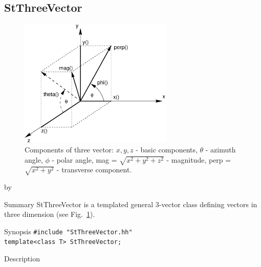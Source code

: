 \documentclass[twoside]{article}
\newcommand{\entrylabel}[1]{\mbox{\textbf{{#1}}}\hfil}%
\newenvironment{entry}
{\begin{list}{}%
    {\renewcommand{\makelabel}{\entrylabel}%
     \setlength{\labelwidth}{90pt}%
     \setlength{\leftmargin}{\labelwidth}
     \advance\leftmargin by \labelsep%
      }%
    }%
  {\end{list}}
\newcommand{\Entrylabel}[1]%
{\raisebox{0pt}[1ex][0pt]{\makebox[\labelwidth][l]%
    {\parbox[t]{\labelwidth}{\hspace{0pt}\textbf{{#1}}}}}}
\newenvironment{Entry}%
{\renewcommand{\entrylabel}{\Entrylabel}\begin{entry}}%
  {\end{entry}}
\begin{document}
\begin{description}
%
%
\subsection{StThreeVector } \label{StThreeVector}
\begin{figure}[bh]
    \begin{center}
        \includegraphics[width=0.65\textwidth]{vec3.eps}
        \caption{Components of three vector: $x,y,z$ - basic components,
            $\theta$ - azimuth angle, $\phi$ - polar angle, mag =
            $\sqrt{x^2+y^2+z^2}$ - magnitude, perp = $\sqrt{x^2+y^2}$
            - transverse component.}
        \label{fig:StThreeVector}
    \end{center}    
\end{figure}

\begin{Entry}
\item[Summary]
    StThreeVector is a templated general 3-vector class defining
    vectors in three dimension (see Fig.~\ref{fig:StThreeVector}).

\item[Synopsis]
    \verb+#include "StThreeVector.hh"+ \\
    \verb+template<class T> StThreeVector;+
    
    
\item[Description]   
    

\end{Entry}
\end{description}
\end{document}
